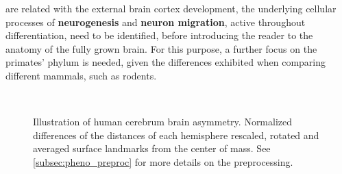 are related with the external brain cortex development, the underlying cellular processes of \textbf{neurogenesis} and  \textbf{neuron migration}, active throughout differentiation, need to be identified, before introducing the reader to the anatomy of the fully grown brain. For this purpose, a further focus on the primates' phylum is needed, given the differences exhibited when comparing different mammals, such as rodents\cite{Molnar2019}.


\begin{figure}[H]
	\centering
	\\
	\caption[Human cerebrum brain asymmetry]{Illustration of human cerebrum brain asymmetry. Normalized differences of the distances of each hemisphere rescaled, rotated and averaged surface landmarks from the center of mass. See \autoref{subsec:pheno_preproc} for more details on the preprocessing.}
	\label{fig:brainlat}
\end{figure}

